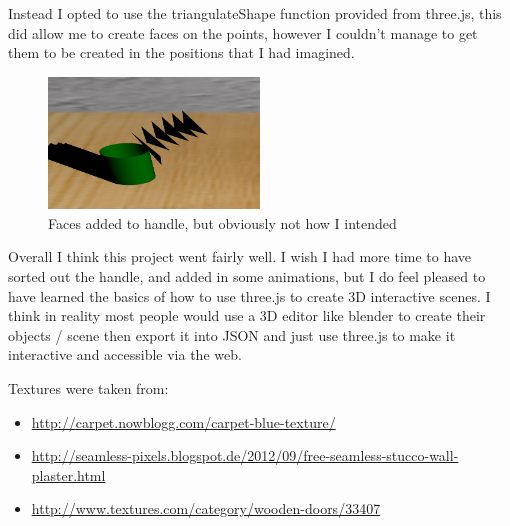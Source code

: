 \documentclass[runningheads,a4paper]{llncs}
\begin{document}
  Instead I opted to use the triangulateShape function provided from three.js, this did allow me to create faces on the points, however I couldn't manage to get them to be created in the positions that I had imagined. 

  \begin{figure}[H]
    \centering
    \includegraphics[width=0.5\textwidth]{images/9.png}
    \caption{Faces added to handle, but obviously not how I intended}
    \label{fig:window}
  \end{figure}

  Overall I think this project went fairly well. I wish I had more time to have sorted out the handle, and added in some animations, but I do feel pleased to have learned the basics of how to use three.js to create 3D interactive scenes. I think in reality most people would use a 3D editor like blender to create their objects / scene then export it into JSON and just use three.js to make it interactive and accessible via the web. 

  
  \begin{thebibliography}{1}
    Textures were taken from:
      \begin{itemize}
	\item\url{http://carpet.nowblogg.com/carpet-blue-texture/} 
	\item\url{http://seamless-pixels.blogspot.de/2012/09/free-seamless-stucco-wall-plaster.html}
	\item\url{http://www.textures.com/category/wooden-doors/33407}
      \end{itemize}

  \end{thebibliography}
\end{document}
